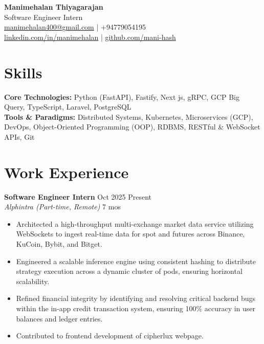 \documentclass[10pt, a4paper]{article}
\begin{document}
\begin{center}
    {\huge \textbf{Manimehalan Thiyagarajan}} \\
    \vspace{4pt}
    Software Engineer Intern \\
    \vspace{4pt}
    \href{mailto:manimehalan400@gmail.com}{manimehalan400@gmail.com} | +94779054195 \\
    \href{https://www.linkedin.com/in/manimehalan/}{linkedin.com/in/manimehalan} | \href{https://github.com/mani-hash}{github.com/mani-hash}
\end{center}

\section{Skills}
\textbf{Core Technologies:} Python (FastAPI), Fastify, Next js, gRPC, GCP Big Query, TypeScript, Laravel, PostgreSQL \\
\textbf{Tools \& Paradigms:} Distributed Systems, Kubernetes, Microservices (GCP), DevOps, Object-Oriented Programming (OOP), RDBMS, RESTful \& WebSocket APIs, Git

\section{Work Experience}
\textbf{Software Engineer Intern} \hfill Oct 2025 \textendash{} Present\\
\textit{Alphintra (Part-time, Remote)} \hfill 7 mos
\begin{itemize}
    \item Architected a high-throughput multi-exchange market data service utilizing WebSockets to ingest real-time data for spot and futures across Binance, KuCoin, Bybit, and Bitget.
    \item Engineered a scalable inference engine using consistent hashing to distribute strategy execution across a dynamic cluster of pods, ensuring horizontal scalability.
    \item Refined financial integrity by identifying and resolving critical backend bugs within the in-app credit transaction system, ensuring 100\% accuracy in user balances and ledger entries.
    \item Contributed to frontend development of cipherlux webpage.
\end{itemize}
\end{document}
